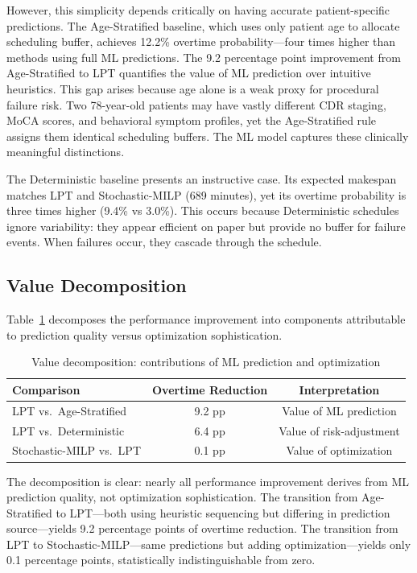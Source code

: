 However, this simplicity depends critically on having accurate patient-specific predictions. The Age-Stratified baseline, which uses only patient age to allocate scheduling buffer, achieves 12.2\% overtime probability---four times higher than methods using full ML predictions. The 9.2 percentage point improvement from Age-Stratified to LPT quantifies the value of ML prediction over intuitive heuristics. This gap arises because age alone is a weak proxy for procedural failure risk. Two 78-year-old patients may have vastly different CDR staging, MoCA scores, and behavioral symptom profiles, yet the Age-Stratified rule assigns them identical scheduling buffers. The ML model captures these clinically meaningful distinctions.

The Deterministic baseline presents an instructive case. Its expected makespan matches LPT and Stochastic-MILP (689 minutes), yet its overtime probability is three times higher (9.4\% vs 3.0\%). This occurs because Deterministic schedules ignore variability: they appear efficient on paper but provide no buffer for failure events. When failures occur, they cascade through the schedule.




\subsection{Value Decomposition}
\label{sec:value_analysis}

Table~\ref{tab:value_analysis} decomposes the performance improvement into components attributable to prediction quality versus optimization sophistication.

\begin{table}[htbp]
\centering
\caption{Value decomposition: contributions of ML prediction and optimization}
\label{tab:value_analysis}
\begin{tabular}{@{}lcc@{}}
\toprule
\textbf{Comparison} & \textbf{Overtime Reduction} & \textbf{Interpretation} \\
\midrule
LPT vs.\ Age-Stratified & 9.2 pp & Value of ML prediction \\
LPT vs.\ Deterministic & 6.4 pp & Value of risk-adjustment \\
Stochastic-MILP vs.\ LPT & 0.1 pp & Value of optimization \\
\bottomrule
\end{tabular}
\end{table}

The decomposition is clear: nearly all performance improvement derives from ML prediction quality, not optimization sophistication. The transition from Age-Stratified to LPT---both using heuristic sequencing but differing in prediction source---yields 9.2 percentage points of overtime reduction. The transition from LPT to Stochastic-MILP---same predictions but adding optimization---yields only 0.1 percentage points, statistically indistinguishable from zero.

